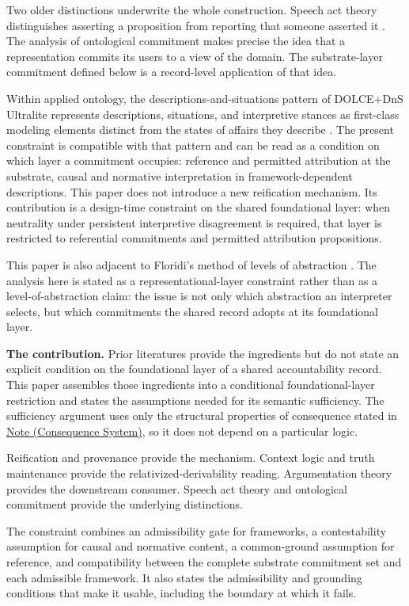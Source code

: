 \documentclass[11pt]{article}
\theoremstyle{plain}
\theoremstyle{definition}
\theoremstyle{remark}
\newcommand{\NoteRef}[2]{\hyperref[#1]{Note (#2)}}
\begin{document}
Two older distinctions underwrite the whole construction.
Speech act theory distinguishes asserting a proposition
from reporting that someone asserted it \citep{searle1969}.
The analysis of ontological commitment \citep{guarino1998}
makes precise the idea that a representation commits its
users to a view of the domain.
The substrate-layer commitment defined below is
a record-level application of that idea.

Within applied ontology,
the descriptions-and-situations pattern of DOLCE+DnS Ultralite
represents descriptions, situations, and interpretive stances
as first-class modeling elements distinct
from the states of affairs they describe
\citep{gangemi2003descriptions}.
The present constraint is compatible with that pattern and
can be read as a condition on which layer a commitment occupies:
reference and permitted attribution at the substrate,
causal and normative interpretation in framework-dependent descriptions.
This paper does not introduce a new reification mechanism.
Its contribution is a design-time constraint on the shared foundational layer:
when neutrality under persistent interpretive disagreement is required,
that layer is restricted
to referential commitments and permitted attribution propositions.

This paper is also adjacent to Floridi's method of levels of abstraction
\citep{floridi2008loa}.
The analysis here is stated as a representational-layer constraint
rather than as a level-of-abstraction claim:
the issue is not only which abstraction an interpreter selects,
but which commitments the shared record adopts at its foundational layer.

\textbf{The contribution.}
Prior literatures provide the ingredients but do not state
an explicit condition on the foundational layer of a shared accountability record.
This paper assembles those ingredients into a conditional
foundational-layer restriction and states the assumptions needed for its
semantic sufficiency.
The sufficiency argument uses only the structural properties
of consequence stated in \NoteRef{se100.note.ConsequenceSystem}{Consequence System},
so it does not depend on a particular logic.

Reification and provenance provide the mechanism.
Context logic and truth maintenance provide the relativized-derivability reading.
Argumentation theory provides the downstream consumer.
Speech act theory and ontological commitment provide the underlying distinctions.

The constraint combines an admissibility gate for frameworks,
a contestability assumption for causal and normative content,
a common-ground assumption for reference,
and compatibility between the complete substrate commitment set and
each admissible framework.
It also states the admissibility and grounding conditions that make it usable,
including the boundary at which it fails.
\end{document}

